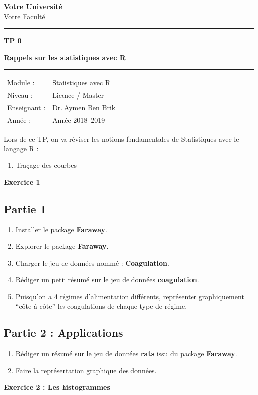 \documentclass[a4paper,12pt]{article}
\newcommand{\university}{Votre Université}
\newcommand{\faculty}{Votre Faculté}
\newcommand{\module}{Statistiques avec R}
\newcommand{\level}{Licence / Master}
\newcommand{\teacher}{Dr. Aymen Ben Brik}
\newcommand{\doctype}{TP 0}
\newcommand{\docdate}{Année 2018--2019}
\newcommand{\makecustomtitle}{
\begin{center}


\vspace{0.5cm}

{\Large \textbf{\university}}\\
{\faculty}

\vspace{0.5cm}

\rule{\linewidth}{0.5mm}

\vspace{0.3cm}

{\Huge \textbf{\doctype}}

\vspace{0.3cm}

{\Large \textbf{Rappels sur les statistiques avec R}}

\vspace{0.3cm}

\rule{\linewidth}{0.5mm}

\vspace{0.5cm}

\begin{tabular}{ll}
Module : & \module \\
Niveau : & \level \\
Enseignant : & \teacher \\
Année : & \docdate \\
\end{tabular}

\end{center}

\vspace{1cm}
}
\begin{document}
\makecustomtitle

\begin{objectif}
Lors de ce TP, on va réviser les notions fondamentales de Statistiques avec le langage R : 
\begin{enumerate}
\item Traçage des courbes
\
\end{enumerate}
\end{objectif}

\begin{exercicebox}
\textbf{Exercice 1}
\end{exercicebox}

\subsection*{Partie 1}

\begin{enumerate}
    \item Installer le package \textbf{Faraway}.
    \item Explorer le package \textbf{Faraway}.
    \item Charger le jeu de données nommé : \textbf{Coagulation}.
    \item Rédiger un petit résumé sur le jeu de données \textbf{coagulation}.
    \item Puisqu'on a 4 régimes d'alimentation différents, représenter graphiquement ``côte à côte'' les coagulations de chaque type de régime.
\end{enumerate}

\subsection*{Partie 2 : Applications}

\begin{enumerate}
    \item Rédiger un résumé sur le jeu de données \textbf{rats} issu du package \textbf{Faraway}.
    \item Faire la représentation graphique des données.
\end{enumerate}

\begin{exercicebox}
\textbf{Exercice 2 : Les histogrammes}
\end{exercicebox}
\end{document}
